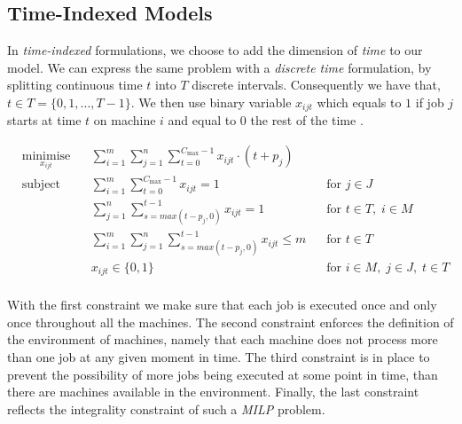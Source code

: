 \subsection*{Time-Indexed Models}

In \textit{time-indexed} formulations, we choose to add the dimension of \textit{time} to our model. We can express the same problem with a \textit{discrete time} formulation, by splitting continuous time \( t \) into \( T \) discrete intervals. Consequently we have that, $ t \in T = \{0,1,\ldots,T-1\} $. We then use binary variable \( x_{ijt} \) which equals to \( 1 \) if job \( j \) starts at time \( t \) on machine \( i \) and equal to \( 0 \) the rest of the time \cite{DUMMY:2}.  \par


\vspace{\baselineskip}
\begin{equation}
\begin{aligned}
& \underset{x_{ijt}}{\text{minimise}}
& & \sum _{i=1}^{m}\sum _{j=1}^{n}\sum _{t=0}^{C_{\max }-1}x_{ijt} \cdot (t+p_{j}) \\
& \text{subject to}
& & \sum _{i=1}^{m}\sum _{t=0}^{C_{\max }-1} x_{ijt} = 1 \;\;\; &\text{for } j \in J\\
& & & \sum _{j=1}^{n}\sum _{s=max(t-p_{j},0)}^{t-1}x_{ijt} = 1 \;\;\; &\text{for } t \in T, \; i \in M\\
& & & \sum _{i=1}^{m}\sum _{j=1}^{n}\sum _{s=max(t-p_{j},0)}^{t-1}x_{ijt} \leq m \;\;\; &\text{for } t \in T\\
& & & x_{ijt} \in  \{ 0,1 \} \;\;\; &\text{for } i \in M, \; j \in J, \; t \in T\\
\end{aligned}
\end{equation}

\vspace{\baselineskip}
\noindent
With the first constraint we make sure that each job is executed once and only once throughout all the machines. The second constraint enforces the definition of the environment of machines, namely that each machine does not process more than one job at any given moment in time. The third constraint is in place to prevent the possibility of more jobs being executed at some point in time, than there are machines available in the environment. Finally, the last constraint reflects the integrality constraint of such a \textit{MILP} problem.   

